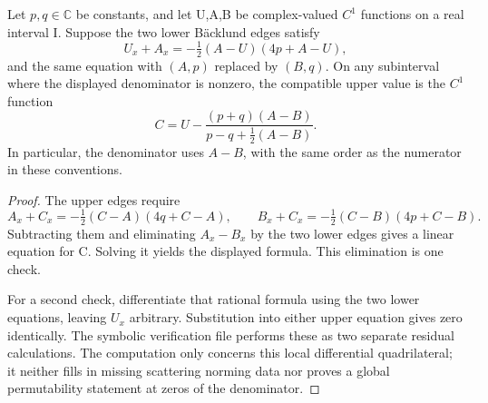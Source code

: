 \begin{proposition}\oursComputed{}
Let \(p,q\in\mathbb C\) be constants, and let U,A,B be
complex-valued \(C^1\) functions on a real interval I. Suppose the
two lower B\"acklund edges satisfy
\[
 U_x+A_x=-\tfrac12(A-U)(4p+A-U),
\]
and the same equation with \((A,p)\) replaced by \((B,q)\).
On any subinterval where the displayed denominator is nonzero,
the compatible upper value is the \(C^1\) function
\[
 C=U-\frac{(p+q)(A-B)}{p-q+\tfrac12(A-B)}.
\]
In particular, the denominator uses \(A-B\), with the same order
as the numerator in these conventions.
\end{proposition}
\begin{proof}
The upper edges require
\[
 A_x+C_x=-\tfrac12(C-A)(4q+C-A),\qquad
 B_x+C_x=-\tfrac12(C-B)(4p+C-B).
\]
Subtracting them and eliminating \(A_x-B_x\) by the two lower
edges gives a linear equation for C. Solving it yields the displayed
formula. This elimination is one check.

For a second check, differentiate that rational formula using the two
lower equations, leaving \(U_x\) arbitrary. Substitution into either
upper equation gives zero identically. The symbolic verification file
performs these as two separate residual calculations. The computation
only concerns this local differential quadrilateral; it neither fills
in missing scattering norming data nor proves a global permutability
statement at zeros of the denominator.
\end{proof}

